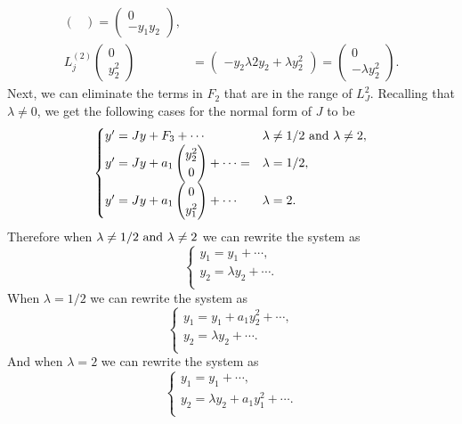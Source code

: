 \documentclass[12pt]{report}
\begin{document}
\begin{solution}
\begin{align*}
\begin{pmatrix}
        \end{pmatrix} = \begin{pmatrix}
            0 \\ - y_1 y_2
        \end{pmatrix},\\
        L_j^{(2)} \begin{pmatrix}
            0 \\ y_2^2
        \end{pmatrix} &= \begin{pmatrix}
            -y_2\lambda 2 y_2 + \lambda y_2^2
        \end{pmatrix} = \begin{pmatrix}
            0 \\ -\lambda y_2^2
        \end{pmatrix}.
    \end{align*}
    Next, we can eliminate the terms in $F_2$ that are in the range of $L_J^2$. Recalling that $\lambda \neq 0$, we get the following cases for the normal form of $J$ to be
    \[
        \begin{cases}
            y' = Jy + F_3 + \cdots  & \lambda \neq 1/2 {~\text{and}~} \lambda \neq 2,\\
            y' = Jy + a_1\begin{pmatrix}
                y_2^2\\0
            \end{pmatrix} + \cdots = &\lambda = 1/2,\\
            y' = Jy + a_1\begin{pmatrix}
                0\\y_1^2
            \end{pmatrix} + \cdots & \lambda = 2.\\  
        \end{cases}
    \] 
    Therefore when $\lambda \neq 1/2 {~\text{and}~} \lambda \neq 2$ we can rewrite the system as
    \[
        \begin{cases}
            y_1 = y_1 + \cdots,\\
            y_2 = \lambda y_2 + \cdots.\\
        \end{cases}
    \]
    When $\lambda = 1/2$ we can rewrite the system as
    \[
        \begin{cases}
            y_1 = y_1 + a_1y_2^2 + \cdots,\\
            y_2 = \lambda y_2 + \cdots.\\
        \end{cases}
    \]
    And when $\lambda = 2$ we can rewrite the system as
    \[
        \begin{cases}
            y_1 = y_1 + \cdots,\\
            y_2 = \lambda y_2 +  a_1 y_1^2 +\cdots.\\
        \end{cases}
    \]
\end{solution}
\end{document}
